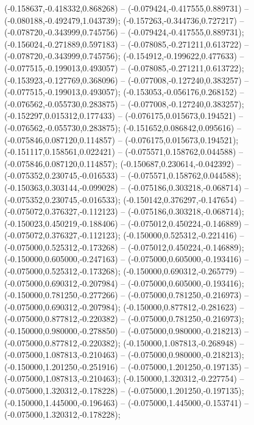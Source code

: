  (-0.158637,-0.418332,0.868268) -- (-0.079424,-0.417555,0.889731) -- (-0.080188,-0.492479,1.043739);
 (-0.157263,-0.344736,0.727217) -- (-0.078720,-0.343999,0.745756) -- (-0.079424,-0.417555,0.889731);
 (-0.156024,-0.271889,0.597183) -- (-0.078085,-0.271211,0.613722) -- (-0.078720,-0.343999,0.745756);
 (-0.154912,-0.199622,0.477633) -- (-0.077515,-0.199013,0.493057) -- (-0.078085,-0.271211,0.613722);
 (-0.153923,-0.127769,0.368096) -- (-0.077008,-0.127240,0.383257) -- (-0.077515,-0.199013,0.493057);
 (-0.153053,-0.056176,0.268152) -- (-0.076562,-0.055730,0.283875) -- (-0.077008,-0.127240,0.383257);
 (-0.152297,0.015312,0.177433) -- (-0.076175,0.015673,0.194521) -- (-0.076562,-0.055730,0.283875);
 (-0.151652,0.086842,0.095616) -- (-0.075846,0.087120,0.114857) -- (-0.076175,0.015673,0.194521);
 (-0.151117,0.158561,0.022421) -- (-0.075571,0.158762,0.044588) -- (-0.075846,0.087120,0.114857);
 (-0.150687,0.230614,-0.042392) -- (-0.075352,0.230745,-0.016533) -- (-0.075571,0.158762,0.044588);
 (-0.150363,0.303144,-0.099028) -- (-0.075186,0.303218,-0.068714) -- (-0.075352,0.230745,-0.016533);
 (-0.150142,0.376297,-0.147654) -- (-0.075072,0.376327,-0.112123) -- (-0.075186,0.303218,-0.068714);
 (-0.150023,0.450219,-0.188406) -- (-0.075012,0.450224,-0.146889) -- (-0.075072,0.376327,-0.112123);
 (-0.150000,0.525312,-0.221416) -- (-0.075000,0.525312,-0.173268) -- (-0.075012,0.450224,-0.146889);
 (-0.150000,0.605000,-0.247163) -- (-0.075000,0.605000,-0.193416) -- (-0.075000,0.525312,-0.173268);
 (-0.150000,0.690312,-0.265779) -- (-0.075000,0.690312,-0.207984) -- (-0.075000,0.605000,-0.193416);
 (-0.150000,0.781250,-0.277266) -- (-0.075000,0.781250,-0.216973) -- (-0.075000,0.690312,-0.207984);
 (-0.150000,0.877812,-0.281623) -- (-0.075000,0.877812,-0.220382) -- (-0.075000,0.781250,-0.216973);
 (-0.150000,0.980000,-0.278850) -- (-0.075000,0.980000,-0.218213) -- (-0.075000,0.877812,-0.220382);
 (-0.150000,1.087813,-0.268948) -- (-0.075000,1.087813,-0.210463) -- (-0.075000,0.980000,-0.218213);
 (-0.150000,1.201250,-0.251916) -- (-0.075000,1.201250,-0.197135) -- (-0.075000,1.087813,-0.210463);
 (-0.150000,1.320312,-0.227754) -- (-0.075000,1.320312,-0.178228) -- (-0.075000,1.201250,-0.197135);
 (-0.150000,1.445000,-0.196463) -- (-0.075000,1.445000,-0.153741) -- (-0.075000,1.320312,-0.178228);
